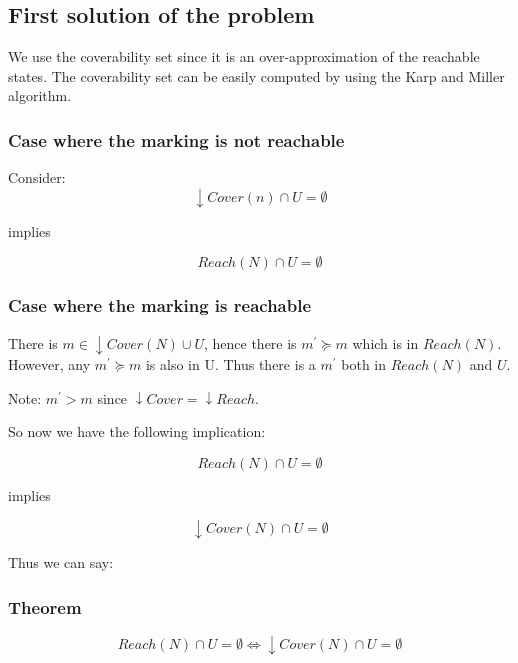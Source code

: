 \subsection{First solution of the problem}
We use the coverability set since it is an over-approximation of the reachable states. The coverability set can be easily computed by using the Karp and Miller algorithm.\par
\subsubsection{Case where the marking is not reachable}
Consider:
\begin{equation*}
    \downarrow Cover(n) \cap U = \emptyset
\end{equation*}

implies

\begin{equation*}
    Reach(N) \cap U = \emptyset
\end{equation*}

\subsubsection{Case where the marking is reachable}
There is $m \in \downarrow Cover(N) \cup U$, hence there is $m^{'} \succeq m$ which is in $Reach(N)$. However, any $m^{'} \succeq m$ is also in U. Thus there is a $m^{'}$ both in $Reach(N)$ and $U$.

Note: $m^{'} > m$ since $\downarrow Cover = \downarrow Reach$.\par

So now we have the following implication:

\begin{equation*}
    Reach(N) \cap U = \emptyset
\end{equation*}

implies

\begin{equation*}
    \downarrow Cover(N) \cap U = \emptyset
\end{equation*}

Thus we can say:
\subsubsection{Theorem}

\begin{equation*}
    Reach(N) \cap U = \emptyset \iff \downarrow Cover(N) \cap U = \emptyset
\end{equation*}


